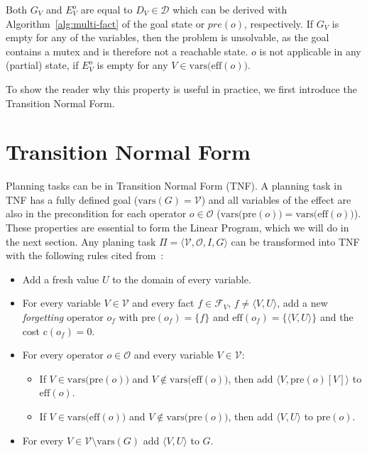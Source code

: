 Both $G_V$ and $E_V^o$ are equal to $D_V\in\mathcal{D}$ which can be derived with Algorithm~\autoref{alg:multi-fact} of the goal state or $pre(o)$, respectively.
If $G_V$ is empty for any of the variables, then the problem is unsolvable, as the goal contains a mutex and is therefore not a reachable state.
$o$ is not applicable in any (partial) state, if $E^o_V$ is empty for any  $V\in\text{vars(eff}(o))$.

To show the reader why this property is useful in practice, we first introduce the Transition Normal Form.

\section{Transition Normal Form}\label{sec:transition-normal-form}
Planning tasks can be in Transition Normal Form (TNF).
A planning task in TNF has a fully defined goal ($\text{vars}(G)=\mathcal{V}$) and all variables of the effect are also in the precondition for each operator $o\in\mathcal{O}$ ($\text{vars(pre}(o)) = \text{vars(eff}(o))$).
These properties are essential to form the Linear Program, which we will do in the next section.
Any planing task  $\Pi = \langle \mathcal{V}, \mathcal{O}, I, G \rangle$ can be transformed into TNF with the following rules cited from~\citeauthor{fivser2020strengthening}:
\begin{itemize}
    \item Add a fresh value $U$ to the domain of every variable.
    \item For every variable $V\in\mathcal{V}$ and every fact $f\in\mathcal{F}_V$, $f\neq\langle V,U\rangle$, add a new \textit{forgetting} operator $o_f$ with $\text{pre}(o_f)=\{f\}$ and $\text{eff}(o_f)=\{\langle V,U\rangle\}$ and the cost $\text{c}(o_f)=0$.
    \item For every operator $o\in\mathcal{O}$ and every variable $V\in\mathcal{V}$:
    \begin{itemize}
        \item If $V\in\text{vars(pre}(o))$ and $V\notin\text{vars(eff}(o))$, then add $\langle V,\text{pre}(o)[V]\rangle$ to $\text{eff}(o)$.
        \item If $V\in\text{vars(eff}(o))$ and $V\notin\text{vars(pre}(o))$, then add $\langle V,U\rangle$ to $\text{pre}(o)$.
    \end{itemize}
    \item For every $V\in\mathcal{V}\setminus\text{vars}(G)$ add $\langle V,U\rangle$ to $G$.
\end{itemize}

